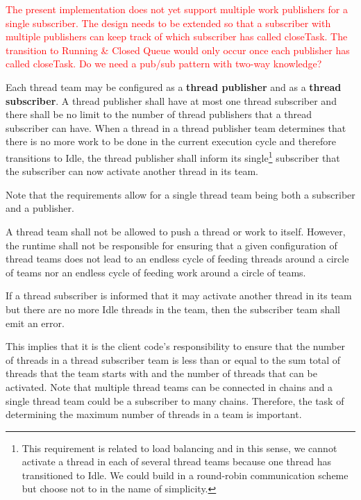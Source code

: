 \documentclass{article}
\begin{document}
\textcolor{red}{The present implementation does not yet support multiple work
publishers for a single subscriber.  The design needs to be extended so that
a subscriber with multiple publishers can keep track of which subscriber has
called closeTask.  The transition to Running \& Closed Queue would only occur
once each publisher has called closeTask.  Do we need a pub/sub pattern with
two-way knowledge?}

\begin{req}
Each thread team may be configured as a \textbf{thread publisher} and as a
\textbf{thread subscriber}.  A thread publisher shall have at most one thread
subscriber and there shall be no limit to the number of thread publishers that a
thread subscriber can have.  When a thread in a thread publisher team determines
that there is no more work to be done in the current execution cycle and
therefore transitions to Idle, the thread publisher shall inform its
single\footnote{This requirement is related to load balancing and in this sense,
we cannot activate a thread in each of several thread teams because one thread
has transitioned to Idle.  We could build in a round-robin communication
scheme but choose not to in the name of simplicity.} subscriber that the
subscriber can now activate another thread in its team.
\end{req}

Note that the requirements allow for a single thread team being both a
subscriber and a publisher.

\begin{req}
A thread team shall not be allowed to push a thread or work to itself.  However,
the runtime shall not be responsible for ensuring that a given configuration of
thread teams does not lead to an endless cycle of feeding threads around a
circle of teams nor an endless cycle of feeding work around a circle of teams.
\end{req}

\begin{req}
If a thread subscriber is informed that it may activate another thread in its
team but there are no more Idle threads in the team, then the subscriber team
shall emit an error.
\end{req}

This implies that it is the client code's responsibility to ensure that the
number of threads in a thread subscriber team is less than or equal to the sum
total of threads that the team starts with and the number of threads that can be
activated.  Note that multiple thread teams can be connected in chains and a
single thread team could be a subscriber to many chains.  Therefore, the task of
determining the maximum number of threads in a team is important.
\end{document}
